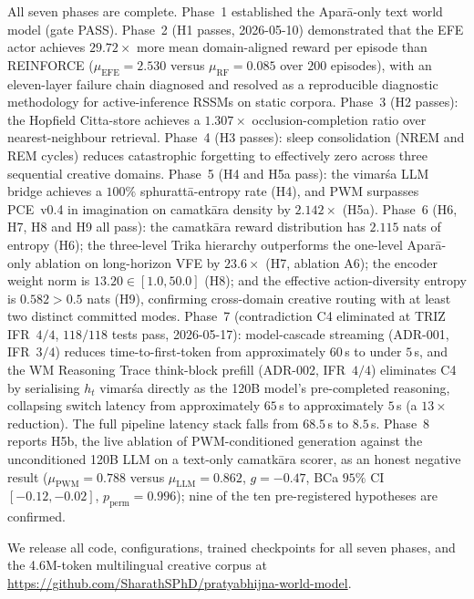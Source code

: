 \documentclass[journal,onecolumn,11pt]{IEEEtran}
\begin{document}
All seven phases are complete.
Phase~1 established the Aparā-only text world model (gate PASS).
Phase~2 (H1 passes, 2026-05-10) demonstrated that the EFE actor achieves
$29.72\times$ more mean domain-aligned reward per episode than REINFORCE
($\mu_{\text{EFE}} = 2.530$ versus $\mu_{\text{RF}} = 0.085$ over $200$
episodes), with an eleven-layer failure chain diagnosed and resolved as a
reproducible diagnostic methodology for active-inference RSSMs on static
corpora.
Phase~3 (H2 passes): the Hopfield Citta-store achieves a $1.307\times$
occlusion-completion ratio over nearest-neighbour retrieval.
Phase~4 (H3 passes): sleep consolidation (NREM and REM cycles) reduces
catastrophic forgetting to effectively zero across three sequential creative
domains.
Phase~5 (H4 and H5a pass): the vimarśa LLM bridge achieves a $100\%$
sphurattā-entropy rate (H4), and PWM surpasses PCE~v0.4 in imagination on
camatkāra density by $2.142\times$ (H5a).
Phase~6 (H6, H7, H8 and H9 all pass): the camatkāra reward distribution has
$2.115$ nats of entropy (H6); the three-level Trika hierarchy outperforms
the one-level Aparā-only ablation on long-horizon VFE by $23.6\times$
(H7, ablation A6); the encoder weight norm is $13.20 \in [1.0, 50.0]$
(H8); and the effective action-diversity entropy is $0.582 > 0.5$ nats
(H9), confirming cross-domain creative routing with at least two distinct
committed modes.
Phase~7 (contradiction C4 eliminated at TRIZ IFR~$4/4$, $118/118$ tests
pass, 2026-05-17): model-cascade streaming (ADR-001, IFR~$3/4$) reduces
time-to-first-token from approximately $60$\,s to under $5$\,s, and the WM
Reasoning Trace think-block prefill (ADR-002, IFR~$4/4$) eliminates C4 by
serialising $h_t$ vimarśa directly as the 120B model's pre-completed
reasoning, collapsing switch latency from approximately $65$\,s to
approximately $5$\,s (a $13\times$ reduction).
The full pipeline latency stack falls from $68.5$\,s to $8.5$\,s.
Phase~8 reports H5b, the live ablation of PWM-conditioned generation
against the unconditioned 120B LLM on a text-only camatkāra scorer, as an
honest negative result ($\mu_{\text{PWM}} = 0.788$ versus
$\mu_{\text{LLM}} = 0.862$, $g = -0.47$, BCa $95\%$ CI $[-0.12, -0.02]$,
$p_{\text{perm}} = 0.996$); nine of the ten pre-registered hypotheses are
confirmed.

We release all code, configurations, trained checkpoints for all seven phases,
and the 4.6M-token multilingual creative corpus at
\url{https://github.com/SharathSPhD/pratyabhijna-world-model}.

\appendices
\end{document}
